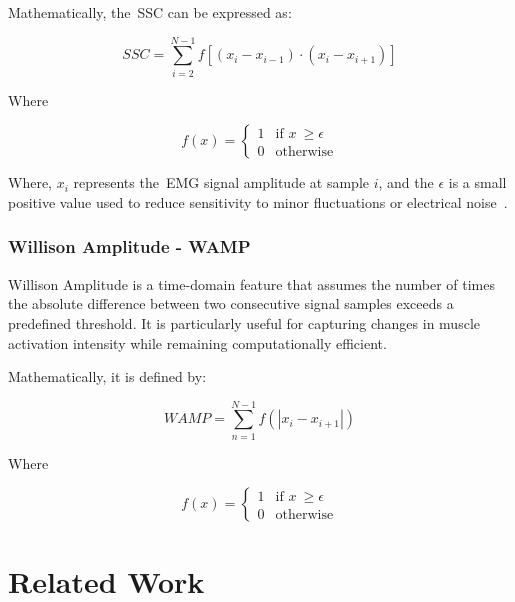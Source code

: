Mathematically, the~\gls{SSC} can be expressed as:

\begin{equation}
  SSC = \sum_{i = 2}^{N - 1} f[(x_i - x_{i-1}) \cdot (x_i - x_{i+1})]
  \label{eq:sscEQ}
\end{equation}

Where

\begin{equation}
  f(x) = \begin{cases}
    1 & \text{if } x~\geq \epsilon \\
    0 & \text{otherwise}
  \end{cases}
  \label{eq:sscEQ2}
\end{equation}

Where, $x_i$ represents the~\gls{EMG} signal amplitude at sample $i$, and the $\epsilon$ is a small positive value used to reduce sensitivity to minor fluctuations or 
electrical noise~\cite{Review_IRBM_EMG}.

\subsubsection{Willison Amplitude - WAMP}
\label{sssec:wamp}

Willison Amplitude is a time-domain feature that assumes the number of times the absolute difference between two consecutive signal samples exceeds a predefined 
threshold. It is particularly useful for capturing changes in muscle activation intensity while remaining computationally efficient\cite{Review_IRBM_EMG, 
EvaluationOfFeatureExtractionAndClassification, EvaluationOfFeatureExtractionAndRecognition, ComparativeStudyOfSEMGFeatureEvaluationMethods, ResearchOnLowerLimbMotionRecognition}.

Mathematically, it is defined by:

\begin{equation}
  WAMP = \sum_{n = 1}^{N - 1} f(\left\lvert x_i - x_{i+1}\right\rvert )
  \label{eq:wampEQ}
\end{equation}

Where

\begin{equation}
  f(x) = \begin{cases}
    1 & \text{if } x~\geq \epsilon \\
    0 & \text{otherwise}
  \end{cases}
  \label{eq:wampEQ2}
\end{equation}

\section{Related Work}
\label{sec:related_work}

